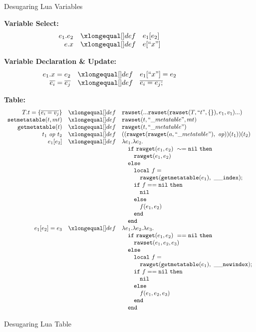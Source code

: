 \begin{figure}
\caption{Desugaring Lua Variables}\label{fig:desLuaVar}
{\bf Variable Select:}\[
\begin{array}{rclcl}

\desugar{e_1.e_2}{e_1[e_2]}
\desugar{e.x}{e[``x"]}

\end{array}\]

{\bf Variable Declaration \& Update:}\[
\begin{array}{rclcl}

\desugar{e_1.x=e_2}{e_1[``x"] = e_2}
\desugar{\overline{e_i}=\overline{e_j}}{\overline{e_i = e_j;}}
\end{array}\]

\caption{Desugaring Lua Table}\label{fig:desLuaTable}
{\bf Table:}\[
\begin{array}{rclcl}
\desugar{T.t = \{\overline{e_i = v_j}\}}{{\tt rawset}(...{\tt rawset}({\tt rawset}(T,``t", \{\}), e_1, v_1)...)}
\desugar{{\tt setmetatable}(t, mt)}{{\tt rawset}(t,``\_metatable", mt)}
\desugar{{\tt getmetatable}(t)}{{\tt rawget}(t,``\_metatable")}
\desugar{t_1~{\it op}~t_2}{(({\tt rawget}({\tt rawget}(a,``\_metatable"),~{\it op}))(t_1))(t_2)}
\desugar{e_1[e_2]}{\lambda e_1.\lambda e_2.}
\desugarline{ 
     \quad{\tt if}~ {\tt rawget}(e_1, e_2) ~\sim= {\tt nil} ~ {\tt then}\\
     \quad\quad{\tt rawget}(e_1, e_2) ~\\
     \quad{\tt else}\\
     \quad\quad{\tt local}~f = \\
     \quad\quad\quad {\tt rawget}({\tt getmetatable}(e_1),~{\tt{\_}{\_}index});\\
     \quad\quad{\tt if}~ f == {\tt nil} ~ {\tt then}\\
     \quad\quad\quad {\tt nil} \\
     \quad\quad{\tt else}\\
     \quad\quad\quad f(e_1,e_2)\\ 
     \quad\quad{\tt end}\\
     \quad{\tt end}\\
     }
\desugar{e_1[e_2]=e_3}{
    \lambda e_1.\lambda e_2.\lambda e_3.
}
\desugarline{  
     \quad{\tt if}~  {\tt rawget}(e_1, e_2) ~== {\tt nil} ~ {\tt then}\\
     \quad\quad{\tt rawset}(e_1, e_2,e_3) ~\\
     \quad{\tt else}\\
     \quad\quad{\tt local}~f = \\
     \quad\quad\quad{\tt rawget}({\tt getmetatable}(e_1),~{\tt{\_}{\_}newindex});\\
     \quad\quad{\tt if}~ f == {\tt nil} ~ {\tt then}\\
     \quad\quad\quad {\tt nil} \\
     \quad\quad{\tt else}\\
     \quad\quad\quad f(e_1,e_2,e_3)\\ 
     \quad\quad{\tt end}\\
     \quad{\tt end}\\
}
\end{array}\]
\end{figure}

